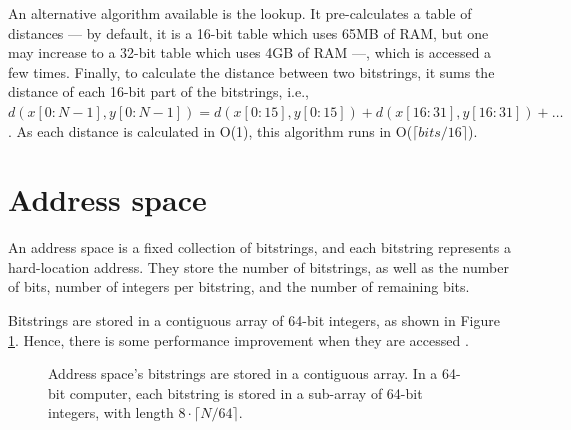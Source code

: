 An alternative algorithm available is the lookup. It pre-calculates a table of distances --- by default, it is a 16-bit table which uses 65MB of RAM, but one may increase to a 32-bit table which uses 4GB of RAM ---, which is accessed a few times. Finally, to calculate the distance between two bitstrings, it sums the distance of each 16-bit part of the bitstrings, i.e., $d(x[0:N-1], y[0:N-1]) = d(x[0:15], y[0:15]) + d(x[16:31], y[16:31]) + \dots$. As each distance is calculated in O(1), this algorithm runs in O($\lceil bits/16 \rceil$).


\section{Address space}

An address space is a fixed collection of bitstrings, and each bitstring represents a hard-location address. They store the number of bitstrings, as well as the number of bits, number of integers per bitstring, and the number of remaining bits.

Bitstrings are stored in a contiguous array of 64-bit integers, as shown in Figure \ref{tab:hl-addresses-detail}. Hence, there is some performance improvement when they are accessed \citep{pai2004linux}.

\begin{figure}
\centering
{}

\caption{Address space's bitstrings are stored in a contiguous array. In a 64-bit computer, each bitstring is stored in a sub-array of 64-bit integers, with length $8 \cdot \lceil N/64 \rceil$.\label{tab:hl-addresses-detail}}
\end{figure}


